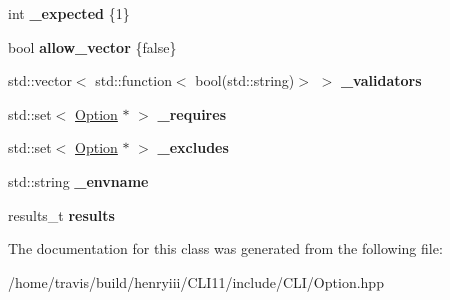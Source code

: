 \begin{DoxyCompactItemize}
\item 
\mbox{\label{class_c_l_i_1_1_option_a5ae06c4d699b1d0dda2b02f1b8a10471}} 
int {\bfseries \+\_\+expected} \{1\}
\item 
\mbox{\label{class_c_l_i_1_1_option_a2ea97d9c465a9f513a609798aad1efde}} 
bool {\bfseries allow\+\_\+vector} \{false\}
\item 
\mbox{\label{class_c_l_i_1_1_option_ade291b995de5e3edf91d24a09843bf9e}} 
std\+::vector$<$ std\+::function$<$ bool(std\+::string)$>$ $>$ {\bfseries \+\_\+validators}
\item 
\mbox{\label{class_c_l_i_1_1_option_a4a55ad3f832e3920a46ee3af449151c3}} 
std\+::set$<$ \hyperlink{class_c_l_i_1_1_option}{Option} $\ast$ $>$ {\bfseries \+\_\+requires}
\item 
\mbox{\label{class_c_l_i_1_1_option_a2f2a7eaae51d9abd0a9b14d2495f09ed}} 
std\+::set$<$ \hyperlink{class_c_l_i_1_1_option}{Option} $\ast$ $>$ {\bfseries \+\_\+excludes}
\item 
\mbox{\label{class_c_l_i_1_1_option_ab303dc34e9f1c37812614f3bd194f296}} 
std\+::string {\bfseries \+\_\+envname}
\item 
\mbox{\label{class_c_l_i_1_1_option_ac7614083a8a3348b0c63a2ce00160816}} 
results\+\_\+t {\bfseries results}
\end{DoxyCompactItemize}


The documentation for this class was generated from the following file\+:\begin{DoxyCompactItemize}
\item 
/home/travis/build/henryiii/\+C\+L\+I11/include/\+C\+L\+I/Option.\+hpp\end{DoxyCompactItemize}
